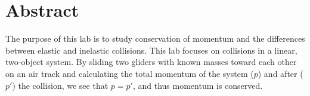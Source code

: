 \section*{Abstract}

\noindent
The purpose of this lab is to study conservation of momentum and the differences between elastic 
and inelastic collisions. This lab focuses on collisions in a linear, two-object system. By sliding 
two gliders with known masses toward each other on an air track and calculating the total momentum 
of the system ($p$) and after ($p'$) the collision, we see that $p = p'$, and thus momentum is 
conserved.